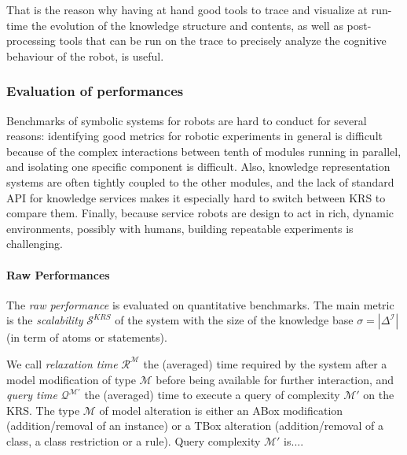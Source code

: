 That is the reason why having at hand good tools to trace and visualize at
run-time the evolution of the knowledge structure and contents, as well as
post-processing tools that can be run on the trace to precisely analyze the
cognitive behaviour of the robot, is useful.

\subsubsection{Evaluation of performances}
\label{sect|performances}


Benchmarks of symbolic systems for robots are hard to conduct for
several reasons: identifying good metrics for robotic experiments in general is
difficult because of the complex interactions between tenth of modules running
in parallel, and isolating one specific component is difficult.
Also, knowledge representation systems are often tightly coupled to
the other modules, and the lack of standard API for knowledge services
makes it especially hard to switch between KRS to compare them. Finally, because
service robots are design to act in rich, dynamic environments, possibly with
humans, building repeatable experiments is challenging.

\begin{scriptsize}
\begin{center}
\end{center}
\end{scriptsize}


\paragraph{Raw Performances} The \emph{raw performance} is evaluated on
quantitative benchmarks. The main metric is the \emph{scalability}
$\mathcal{S}^{KRS}$ of the system with the size of the knowledge base
$\sigma=|\Delta^{\mathcal{I}}|$  (in term of atoms or statements).

We call \emph{relaxation time} $\mathcal{R}^{\mathcal{M}}$ the (averaged) time
required by the system after a model modification of type $\mathcal{M}$ before
being available for further interaction, and \emph{query time}
$\mathcal{Q}^{\mathcal{M}'}$ the (averaged) time to execute a query of
complexity $\mathcal{M}'$ on the KRS. The type $\mathcal{M}$ of model
alteration is either an ABox modification (addition/removal of an instance) or
a TBox alteration (addition/removal of a class, a class restriction or a rule).
Query complexity $\mathcal{M}'$ is....

